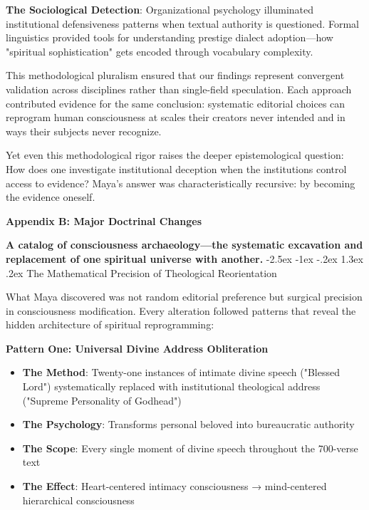 \documentclass[12pt,twoside]{book}
\makeatletter
\renewcommand\section{\@startsection{section}{1}{\z@}%
{-2.5ex \@plus -1ex \@minus -.2ex}%
{1.3ex \@plus.2ex}%
{\normalfont\Large\bfseries}}
\makeatother
\begin{document}
\textbf{\textbf{The Sociological Detection}}: Organizational psychology illuminated institutional defensiveness patterns when textual authority is questioned. Formal linguistics provided tools for understanding prestige dialect adoption—how "spiritual sophistication" gets encoded through vocabulary complexity.

This methodological pluralism ensured that our findings represent convergent validation across disciplines rather than single-field speculation. Each approach contributed evidence for the same conclusion: systematic editorial choices can reprogram human consciousness at scales their creators never intended and in ways their subjects never recognize.

Yet even this methodological rigor raises the deeper epistemological question: How does one investigate institutional deception when the institutions control access to evidence? Maya's answer was characteristically recursive: by becoming the evidence oneself.

\clearpage
\thispagestyle{empty}
\mbox{}
\newpage
\pagestyle{sectionopening}
\thispagestyle{sectionopening}
\markboth{}{}
\markright{}
\vspace*{0.25\textheight}
\begin{center}
{\Huge\bfseries Appendix B: Major Doctrinal Changes}
\end{center}
\newpage

\textbf{A catalog of consciousness archaeology—the systematic excavation and replacement of one spiritual universe with another.}
\section{The Mathematical Precision of Theological Reorientation}
\label{sec:org41d97c1}

What Maya discovered was not random editorial preference but surgical precision in consciousness modification. Every alteration followed patterns that reveal the hidden architecture of spiritual reprogramming:

\textbf{\textbf{Pattern One: Universal Divine Address Obliteration}}
\begin{itemize}
\item \textbf{\textbf{The Method}}: Twenty-one instances of intimate divine speech ("Blessed Lord") systematically replaced with institutional theological address ("Supreme Personality of Godhead")
\item \textbf{\textbf{The Psychology}}: Transforms personal beloved into bureaucratic authority
\item \textbf{\textbf{The Scope}}: Every single moment of divine speech throughout the 700-verse text
\item \textbf{\textbf{The Effect}}: Heart-centered intimacy consciousness → mind-centered hierarchical consciousness
\end{itemize}
\end{document}
